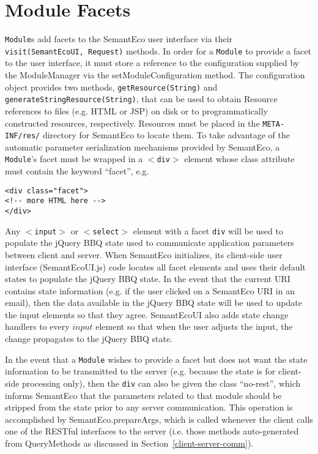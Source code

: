 \documentclass[letterpaper]{report}
\begin{document}
\section{Module Facets}
\label{facets}
\texttt{Module}s add facets to the SemantEco user interface via their \texttt{visit(SemantEcoUI, Request)} methods. In order for a \texttt{Module} to provide a facet to the user interface, it must store a reference to the configuration supplied by the ModuleManager via the setModuleConfiguration method. The configuration object provides two methods, \texttt{getResource(String)} and \texttt{generateStringResource(String)}, that can be used to obtain Resource references to files (e.g. HTML or JSP) on disk or to programmatically constructed resources, respectively. Resources must be placed in the \texttt{META-INF/res/} directory for SemantEco to locate them. To take advantage of the automatic parameter serialization mechanisms provided by SemantEco, a \texttt{Module}'s facet must be wrapped in a \texttt{$<$div$>$} element whose class attribute must contain the keyword ``facet'', e.g.

\begin{verbatim}
<div class="facet">
<!-- more HTML here -->
</div>
\end{verbatim}

Any \texttt{$<$input$>$} or \texttt{$<$select$>$} element with a facet \texttt{div} will be used to populate the jQuery BBQ state used to communicate application parameters between client and server. When SemantEco initializes, its client-side user interface (SemantEcoUI.js) code locates all facet elements and uses their default states to populate the jQuery BBQ state. In the event that the current URI contains state information (e.g. if the user clicked on a SemantEco URI in an email), then the data available in the jQuery BBQ state will be used to update the input elements so that they agree. SemantEcoUI also adds state change handlers to every $input$ element so that when the user adjusts the input, the change propagates to the jQuery BBQ state.

In the event that a \texttt{Module} wishes to provide a facet but does not want the state information to be transmitted to the server (e.g. because the state is for client-side processing only), then the \texttt{div} can also be given the class ``no-rest'', which informs SemantEco that the parameters related to that module should be stripped from the state prior to any server communication. This operation is accomplished by SemantEco.prepareArgs, which is called whenever the client calls one of the RESTful interfaces to the server (i.e. those methods auto-generated from QueryMethods as discussed in Section~\ref{client-server-comm}).
\end{document}
